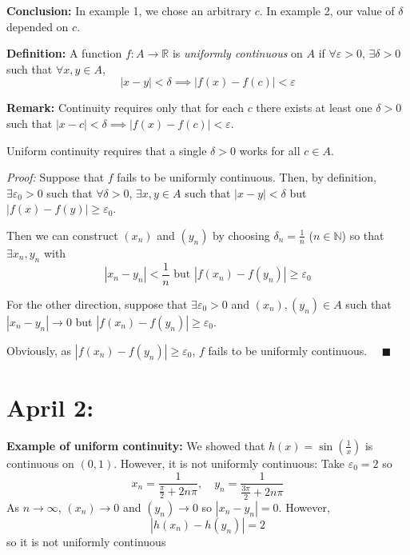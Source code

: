 \documentclass[12pt]{report}
\newcommand{\R}{\mathbb{R}}
\newcommand{\N}{\mathbb{N}}
\newcommand{\qed}{\quad \blacksquare}
\newcommand{\abs}[1]{\left\vert #1 \right\vert}
\newcommand{\ep}{\varepsilon}
\newenvironment*{tbox}[2][gray]{
    \begin{tcolorbox}[
        parbox=false,
        colback=#1!5!white,
        colframe=#1!75!black,
        breakable,
        title={#2}
    ]}
    {\end{tcolorbox}}
\begin{document}
        \textbf{Conclusion:} In example 1, we chose an arbitrary $c$. In example 2, our value of $\delta$ depended on $c$. 
 
        \textbf{Definition:} A function $f: A \to \R$ is \emph{uniformly continuous} on $A$ if $\forall \ep > 0$, $\exists \delta > 0$ such that $\forall x, y \in A$,
        \[\abs{x - y} < \delta \implies \abs{f(x) - f(c)} < \ep\] 

        \textbf{Remark:} Continuity requires only that for each $c$ there exists at least one $\delta > 0$ such that $\abs{x - c} < \delta \implies \abs{f(x) - f(c)} < \ep$.

        Uniform continuity requires that a single $\delta > 0$ works for all $c \in A$. 

        \begin{tbox}{\textbf{Seqential Criterion for Absence of Uniform Continuity:} $f: A \to \R$ fails to be uniformly continuous iff $\exists \ep_0 > 0$ and $(x_n), (y_n) \in A$ such that $\forall \delta > 0$, 
            \[\abs{x - y} \to 0 \text{ but } \abs{f(x) - f(y)} \geq \ep_0\]}
            \emph{Proof:} Suppose that $f$ fails to be uniformly continuous. Then, by definition, $\exists \ep_0 > 0$ such that $\forall \delta > 0$, $\exists x, y \in A$ such that $\abs{x - y} < \delta$ but $\abs{f(x) - f(y)} \geq \ep_0$.
            
            Then we can construct $(x_n)$ and $(y_n)$ by choosing $\delta_n = \frac{1}{n}$ ($n \in \N$) so that $\exists x_n, y_n$ with 
            \[\abs{x_n - y_n} < \frac{1}{n} \text{ but } \abs{f(x_n) - f(y_n)} \geq \ep_0\]

            For the other direction, suppose that $\exists \ep_0 > 0$ and $(x_n), (y_n) \in A$ such that $\abs{x_n - y_n} \to 0$ but $\abs{f(x_n) - f(y_n)} \geq \ep_0$. 

            Obviously, as $\abs{f(x_n) - f(y_n)} \geq \ep_0$, $f$ fails to be uniformly continuous. $\qed$
        \end{tbox}

\section{April 2:} 
    \textbf{Example of uniform continuity:} We showed that $h(x) = \sin(\frac{1}{x})$ is continuous on $(0, 1)$. However, it is not uniformly continuous: Take $\ep_0 = 2$ so 
    \[x_n = \frac{1}{\frac{\pi}{2} + 2n\pi}, \quad y_n = \frac{1}{\frac{3\pi}{2} + 2n\pi}\]
    As $n \to \infty$, $(x_n) \to 0$ and $(y_n) \to 0$ so $\abs{x_n - y_n} = 0$. However, 
    \[\abs{h(x_n) - h(y_n)} = 2\]
    so it is not uniformly continuous
\end{document}
